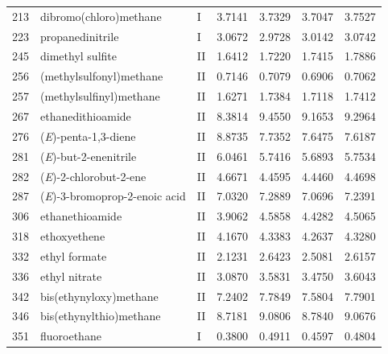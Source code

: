 \begin{longtable}{rlld{2.5}d{2.5}d{2.5}d{2.5}}
    213  & dibromo(chloro)methane                                 & I  & 3.7141  & 3.7329  & 3.7047  & 3.7527  \\
    223  & propanedinitrile                                       & I  & 3.0672  & 2.9728  & 3.0142  & 3.0742  \\
    245  & dimethyl sulfite                                       & II & 1.6412  & 1.7220  & 1.7415  & 1.7886  \\
    256  & (methylsulfonyl)methane                                & II & 0.7146  & 0.7079  & 0.6906  & 0.7062  \\
    257  & (methylsulfinyl)methane                                & II & 1.6271  & 1.7384  & 1.7118  & 1.7412  \\
    267  & ethanedithioamide                                      & II & 8.3814  & 9.4550  & 9.1653  & 9.2964  \\
    276  & (\textit{E})-penta-1,3-diene                           & II & 8.8735  & 7.7352  & 7.6475  & 7.6187  \\
    281  & (\textit{E})-but-2-enenitrile                          & II & 6.0461  & 5.7416  & 5.6893  & 5.7534  \\
    282  & (\textit{E})-2-chlorobut-2-ene                         & II & 4.6671  & 4.4595  & 4.4460  & 4.4698  \\
    287  & (\textit{E})-3-bromoprop-2-enoic   acid                & II & 7.0320  & 7.2889  & 7.0696  & 7.2391  \\
    306  & ethanethioamide                                        & II & 3.9062  & 4.5858  & 4.4282  & 4.5065  \\
    318  & ethoxyethene                                           & II & 4.1670  & 4.3383  & 4.2637  & 4.3280  \\
    332  & ethyl formate                                          & II & 2.1231  & 2.6423  & 2.5081  & 2.6157  \\
    336  & ethyl nitrate                                          & II & 3.0870  & 3.5831  & 3.4750  & 3.6043  \\
    342  & bis(ethynyloxy)methane                                 & II & 7.2402  & 7.7849  & 7.5804  & 7.7901  \\
    346  & bis(ethynylthio)methane                                & II & 8.7181  & 9.0806  & 8.7840  & 9.0676  \\
    351  & fluoroethane                                           & I  & 0.3800  & 0.4911  & 0.4597  & 0.4804  \\

\end{longtable}
